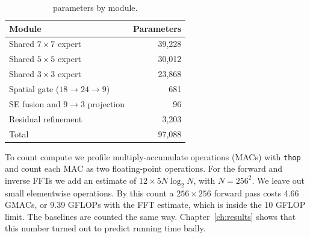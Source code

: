 \begin{table}[htbp]
	\centering
	\caption{\fcsg{} parameters by module.}
	\label{tab:params}
	\begin{tabular}{@{}lr@{}}
		\toprule
		Module & Parameters \\
		\midrule
		Shared $7\times7$ expert            & 39,228 \\
		Shared $5\times5$ expert            & 30,012 \\
		Shared $3\times3$ expert            & 23,868 \\
		Spatial gate ($18\to24\to9$)        & 681 \\
		SE fusion and $9\to3$ projection    & 96 \\
		Residual refinement                 & 3,203 \\
		\midrule
		Total                               & 97,088 \\
		\bottomrule
	\end{tabular}
\end{table}

To count compute we profile multiply-accumulate operations (MACs) with
\texttt{thop} and count each MAC as two floating-point operations. For the
forward and inverse FFTs we add an estimate of $12 \times 5N\log_2 N$, with
$N = 256^2$. We leave out small elementwise operations. By this count a
$256\times256$ forward pass costs 4.66 GMACs, or 9.39 GFLOPs with the FFT
estimate, which is inside the 10 GFLOP limit. The baselines are counted the
same way. Chapter~\ref{ch:results} shows that this number turned out to
predict running time badly.
